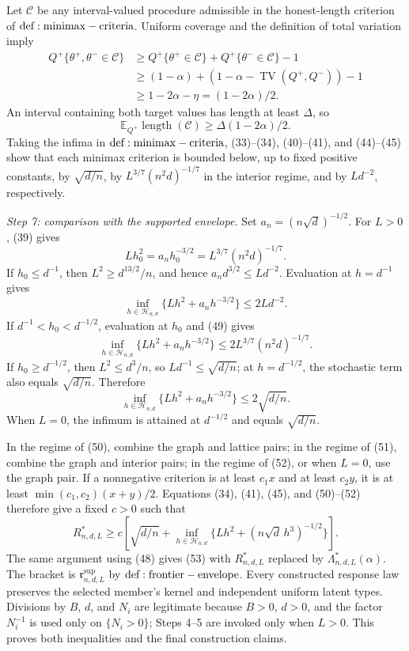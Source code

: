 Let \(\mathcal C\) be any interval-valued procedure admissible in the honest-length criterion of \({\rm def:minimax-criteria}\).  Uniform coverage and the definition of total variation imply
\[
 \begin{aligned}
 Q^+\{\theta^+,\theta^-\in\mathcal C\}
 &\geq Q^+\{\theta^+\in\mathcal C\}
      +Q^+\{\theta^-\in\mathcal C\}-1\\
 &\geq(1-\alpha)+(1-\alpha-\operatorname{TV}(Q^+,Q^-))-1\\
 &\geq1-2\alpha-\eta=(1-2\alpha)/2.
 \end{aligned}
\tag{47}
\]
An interval containing both target values has length at least \(\Delta\), so
\[
 \mathbb E_{Q^+}\operatorname{length}(\mathcal C)
 \geq\Delta(1-2\alpha)/2.
\tag{48}
\]
Taking the infima in \({\rm def:minimax-criteria}\), (33)--(34), (40)--(41), and (44)--(45) show that each minimax criterion is bounded below, up to fixed positive constants, by \(\sqrt{d/n}\), by \(L^{3/7}(n^2d)^{-1/7}\) in the interior regime, and by \(Ld^{-2}\), respectively.

\textit{Step 7: comparison with the supported envelope.}
Set \(a_n=(n\sqrt d)^{-1/2}\).  For \(L>0\), (39) gives
\[
 Lh_0^2=a_nh_0^{-3/2}=L^{3/7}(n^2d)^{-1/7}.
\tag{49}
\]
If \(h_0\leq d^{-1}\), then \(L^2\geq d^{13/2}/n\), and hence \(a_nd^{3/2}\leq Ld^{-2}\).  Evaluation at \(h=d^{-1}\) gives
\[
 \inf_{h\in\mathcal H_{n,d}}\{Lh^2+a_nh^{-3/2}\}
 \leq2Ld^{-2}.
\tag{50}
\]
If \(d^{-1}<h_0<d^{-1/2}\), evaluation at \(h_0\) and (49) gives
\[
 \inf_{h\in\mathcal H_{n,d}}\{Lh^2+a_nh^{-3/2}\}
 \leq2L^{3/7}(n^2d)^{-1/7}.
\tag{51}
\]
If \(h_0\geq d^{-1/2}\), then \(L^2\leq d^3/n\), so \(Ld^{-1}\leq\sqrt{d/n}\); at \(h=d^{-1/2}\), the stochastic term also equals \(\sqrt{d/n}\).  Therefore
\[
 \inf_{h\in\mathcal H_{n,d}}\{Lh^2+a_nh^{-3/2}\}
 \leq2\sqrt{d/n}.
\tag{52}
\]
When \(L=0\), the infimum is attained at \(d^{-1/2}\) and equals \(\sqrt{d/n}\).

In the regime of (50), combine the graph and lattice pairs; in the regime of (51), combine the graph and interior pairs; in the regime of (52), or when \(L=0\), use the graph pair.  If a nonnegative criterion is at least \(c_1x\) and at least \(c_2y\), it is at least \(\min(c_1,c_2)(x+y)/2\).  Equations (34), (41), (45), and (50)--(52) therefore give a fixed \(c>0\) such that
\[
 R^*_{n,d,L}\geq c\left[\sqrt{d/n}+
 \inf_{h\in\mathcal H_{n,d}}\{Lh^2+(n\sqrt d\,h^3)^{-1/2}\}\right].
\tag{53}
\]
The same argument using (48) gives (53) with \(R^*_{n,d,L}\) replaced by \(\Lambda^*_{n,d,L}(\alpha)\).  The bracket is \(\mathfrak r^{\mathrm{sup}}_{n,d,L}\) by \({\rm def:frontier-envelope}\).  Every constructed response law preserves the selected member's kernel and independent uniform latent types.  Divisions by \(B\), \(d\), and \(N_i\) are legitimate because \(B>0\), \(d>0\), and the factor \(N_i^{-1}\) is used only on \(\{N_i>0\}\); Steps 4--5 are invoked only when \(L>0\).  This proves both inequalities and the final construction claims.